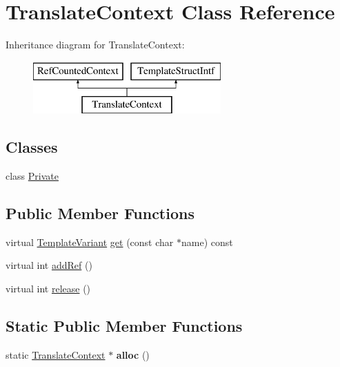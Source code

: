 \hypertarget{class_translate_context}{}\section{Translate\+Context Class Reference}
\label{class_translate_context}
Inheritance diagram for Translate\+Context\+:\begin{figure}[H]
\begin{center}
\leavevmode
\includegraphics[height=2.000000cm]{class_translate_context}
\end{center}
\end{figure}
\subsection*{Classes}
\begin{DoxyCompactItemize}
\item 
class \mbox{\hyperlink{class_translate_context_1_1_private}{Private}}
\end{DoxyCompactItemize}
\subsection*{Public Member Functions}
\begin{DoxyCompactItemize}
\item 
virtual \mbox{\hyperlink{class_template_variant}{Template\+Variant}} \mbox{\hyperlink{class_translate_context_ab0fad4b75cd53cb3c22e8e1adee1c260}{get}} (const char $\ast$name) const
\item 
virtual int \mbox{\hyperlink{class_translate_context_a8c6e3af2496041690177372ac2bf56cf}{add\+Ref}} ()
\item 
virtual int \mbox{\hyperlink{class_translate_context_a1fa557ada4404a339cae9d011074a56b}{release}} ()
\end{DoxyCompactItemize}
\subsection*{Static Public Member Functions}
\begin{DoxyCompactItemize}
\item 
\mbox{\label{class_translate_context_a3f97bc1e7988d9cae10c06e2bdde332b}} 
static \mbox{\hyperlink{class_translate_context}{Translate\+Context}} $\ast$ {\bfseries alloc} ()
\end{DoxyCompactItemize}


